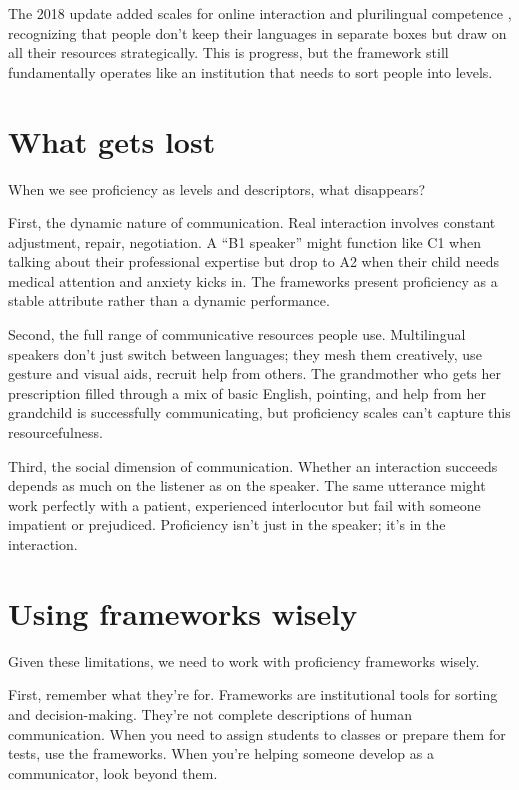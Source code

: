 The 2018 update added scales for online interaction and plurilingual competence \citep[3, 7]{CouncilOfEurope2020}, recognizing that people don't keep their languages in separate boxes but draw on all their resources strategically. This is progress, but the framework still fundamentally operates like an institution that needs to sort people into levels.

\section{What gets lost}

When we see proficiency as levels and descriptors, what disappears?

First, the dynamic nature of communication. Real interaction involves constant adjustment, repair, negotiation. A \enquote{B1 speaker} might function like C1 when talking about their professional expertise but drop to A2 when their child needs medical attention and anxiety kicks in. The frameworks present proficiency as a stable attribute rather than a dynamic performance.

Second, the full range of communicative resources people use. Multilingual speakers don't just switch between languages; they mesh them creatively, use gesture and visual aids, recruit help from others. The grandmother who gets her prescription filled through a mix of basic English, pointing, and help from her grandchild is successfully communicating, but proficiency scales can't capture this resourcefulness.

Third, the social dimension of communication. Whether an interaction succeeds depends as much on the listener as on the speaker. The same utterance might work perfectly with a patient, experienced interlocutor but fail with someone impatient or prejudiced. Proficiency isn't just in the speaker; it's in the interaction.

\section{Using frameworks wisely}

Given these limitations, we need to work with proficiency frameworks wisely.

First, remember what they're for. Frameworks are institutional tools for sorting and decision-making. They're not complete descriptions of human communication. When you need to assign students to classes or prepare them for tests, use the frameworks. When you're helping someone develop as a communicator, look beyond them.

